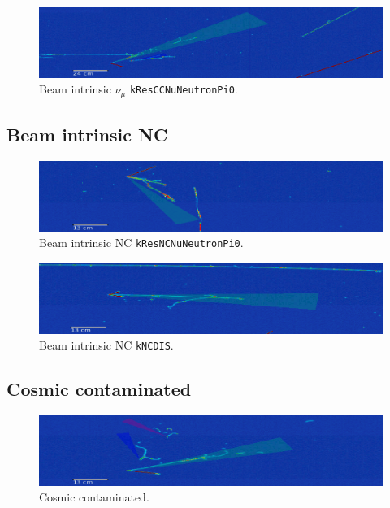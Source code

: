 \begin{figure}[htbp]
\centering
  \includegraphics[width=0.75\linewidth]{evds/1_5848_292397_numu_kResCCNuNeutronPi0.png}
  \caption{Beam intrinsic $\nu_{\mu}$ \texttt{kResCCNuNeutronPi0}.}
\end{figure}

\subsection*{Beam intrinsic NC}

\begin{figure}[H]
\centering
  \includegraphics[width=0.75\linewidth]{evds/1_8996_449795_NC_kResNCNuNeutronPi0.png}
  \caption{Beam intrinsic NC \texttt{kResNCNuNeutronPi0}.}
\end{figure}

\begin{figure}[H]
\centering
  \includegraphics[width=0.75\linewidth]{evds/1_8275_413724_nc_kNCDIS.png}
  \caption{Beam intrinsic NC \texttt{kNCDIS}.}
\end{figure}

\subsection*{Cosmic contaminated}
\begin{figure}[H]
\centering
  \includegraphics[width=0.75\linewidth]{evds/1_3458_172877_mixed_kResCCNuNeutronPi0.png}
  \caption{Cosmic contaminated.}
\end{figure}


